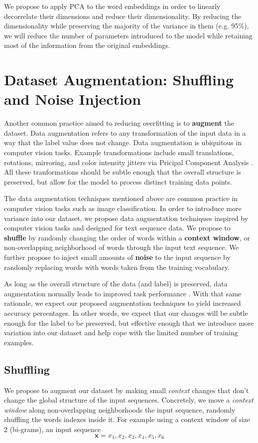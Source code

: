 We propose to apply PCA to the word embeddings in order to linearly decorrelate their dimensions and reduce their dimensionality.
By reducing the dimensionality while preserving the majority of the variance in them (e.g. 95\%), we will reduce the number of parameters introduced
to the model while retaining most of the information from the original embeddings.



\section{Dataset Augmentation: Shuffling and Noise Injection}
Another common practice aimed to reducing overfitting is to \textbf{augment} the dataset.
Data augmentation refers to any transformation of the input data in a way that
the label value does not change. Data augmentation is ubiquitous in computer vision tasks. Example transformations include small translations,
rotations, mirroring, and color intensity jitters via Pricipal Component Analysis \cite{krizhevsky2012imagenet}. All these tranformations should be subtle enough that the overall structure is preserved, but
allow for the model to process distinct training data points.

The data augmentation techniques mentioned above are common practice in computer vision tasks such as image classification.
In order to introduce more variance into our dataset, we propose data augmentation techniques inspired by computer vision tasks and designed for
text sequence data.
We propose to \textbf{shuffle} by randomly changing the order of words within a \textbf{context window}, or non-overlapping neighborhood of words
through the input text sequence.
We further propose to inject small amounts of \textbf{noise} to the input sequence by randomly replacing words with words taken from the training vocabulary.

As long as the overall structure of the data (and label) is preserved, data augmentation normally leads to improved task performance \cite{chawla2002smote}\cite{he2016deep}
\cite{jaderberg2015spatial}\cite{krizhevsky2012imagenet}.
With that same rationale, we expect our proposed augmentation techniques to yield increased accuracy percentages. In other words, we expect that
our changes will be subtle enough for the label to be preserved, but effective enough that we introduce more variation into our dataset and help cope with
the limited number of training examples.


\subsection{Shuffling}
We propose to augment our dataset by making small \textit{context} changes that don't change the global structure
of the input sequences. Concretely, we move a \textit{context window} along non-overlapping neighborhoods the input sequence, randomly
shuffling the words indexes inside it. For example using a context window of size 2 (bi-grams), an input sequence
\[\bm{x} = x_1, x_2, x_3, x_4, x_5, x_6\]

